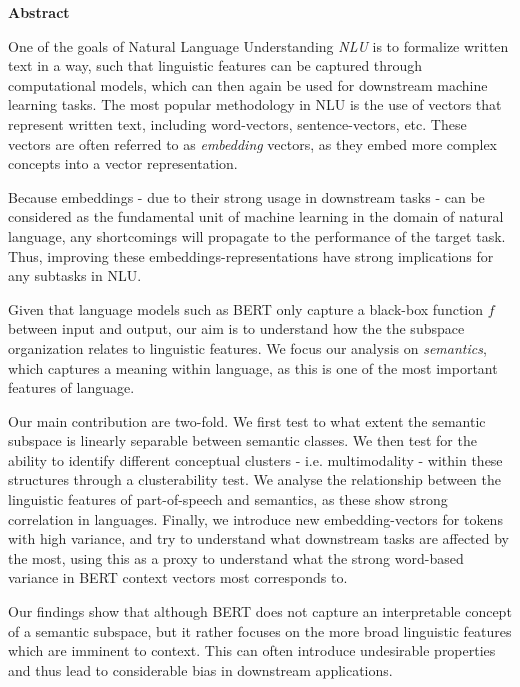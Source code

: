 \newpage
{\Huge \bf Abstract}
\vspace{24pt} 

One of the goals of Natural Language Understanding \textit{NLU} is to formalize written text in a way, such that linguistic features can be captured through computational models, which can then again be used for downstream machine learning tasks.
The most popular methodology in NLU is the use of vectors that represent written text, including word-vectors, sentence-vectors, etc. 
These vectors are often referred to as \textit{embedding} vectors, as they embed more complex concepts into a vector representation.

Because embeddings - due to their strong usage in downstream tasks - can be considered as the fundamental unit of machine learning in the domain of natural language, any shortcomings will propagate to the performance of the target task.
Thus, improving these embeddings-representations have strong implications for any subtasks in NLU.

Given that language models such as BERT only capture a black-box function $f$ between input and output, our aim is to understand how the the subspace organization relates to linguistic features.
We focus our analysis on \textit{semantics}, which captures a meaning within language, as this is one of the most important features of language.

Our main contribution are two-fold. 
We first test to what extent the semantic subspace is linearly separable between semantic classes.
We then test for the ability to identify different conceptual clusters - i.e. multimodality -  within these structures through a clusterability test.
We analyse the relationship between the linguistic features of part-of-speech and semantics, as these show strong correlation in languages.
Finally, we introduce new embedding-vectors for tokens with high variance, and try to understand what downstream tasks are affected by the most, using this as a proxy to understand what the strong word-based variance in BERT context vectors most corresponds to.

Our findings show that although BERT does not capture an interpretable concept of a semantic subspace, but it rather focuses on the more broad linguistic features which are imminent to context.
This can often introduce undesirable properties and thus lead to considerable bias in downstream applications.


